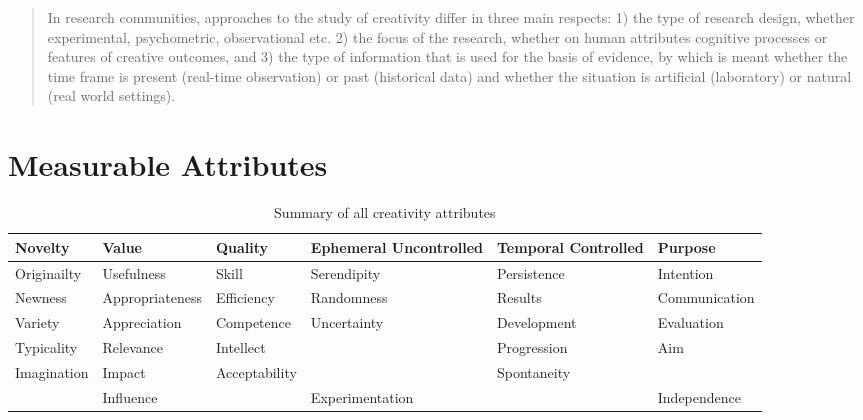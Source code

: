 \begin{quote}
  In research communities, approaches to the study of creativity differ in three main respects: 1) the type of research design, whether experimental, psychometric, observational etc. 2) the focus of the research, whether on human attributes cognitive processes or features of creative outcomes, and 3) the type of information that is used for the basis of evidence, by which is meant whether the time frame is present (real-time observation) or past (historical data) and whether the situation is artificial (laboratory) or natural (real world settings). \citep[p.3]{Candy2012}
\end{quote}

\begin{comment}
  distinguishing between person’s and product’s creativity \citep[p.258]{Piffer2012}
  it is concluded that a person’s creativity can only be assessed indirectly (for example with self report questionnaires or official external recognition) but it cannot be measured \citep[p.258]{Piffer2012}
\end{comment}


\section{Measurable Attributes}

\begin{table}[htb]
  \begin{tabu}{XXXXXX}
  \toprule
  \textbf{Novelty}
  &
  \textbf{Value}
  &
  \textbf{Quality}
  &
  \textbf{Ephemeral Uncontrolled}
  &
  \textbf{Temporal Controlled}
  &
  \textbf{Purpose}
  \\ \midrule
  Originailty
  &
  Usefulness
  &
  Skill
  &
  Serendipity
  &
  Persistence
  &
  Intention
  \\ \midrule
  Newness
  &
  Appropriateness
  &
  Efficiency
  &
  Randomness
  &
  Results
  &
  Communication
  \\ \midrule
  Variety
  &
  Appreciation
  &
  Competence
  &
  Uncertainty
  &
  Development
  &
  Evaluation
  \\ \midrule
  Typicality
  &
  Relevance
  &
  Intellect
  &
  &
  Progression
  &
  Aim
  \\ \midrule
  Imagination
  &
  Impact
  &
  Acceptability
  &
  &
  Spontaneity
  &
  \\ \midrule
  &
  Influence
  &
  &
  Experimentation
  &
  &
  Independence
  \\
  \bottomrule
  \end{tabu}
\caption[Creativity attributes]{Summary of all creativity attributes}
\label{creatt}
\end{table}

